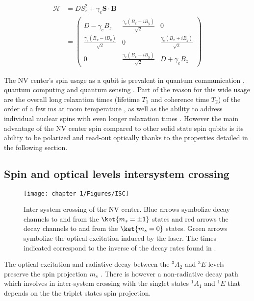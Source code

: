 \documentclass[a4paper,11pt]{report}
\begin{document}
\begin{refsection}
\begin{align}
\label{NV spin Hamiltonian basic}
\mathcal{H}&=D S_z^2 + \gamma_e \mathbf{S} \cdot \mathbf{B} \\
&=\begin{pmatrix}
D-\gamma_e B_z & \frac{\gamma_e (B_x+iB_y)}{\sqrt{2}} & 0 \\
\frac{\gamma_e (B_x-iB_y)}{\sqrt{2}} & 0 & \frac{\gamma_e (B_x+iB_y)}{\sqrt{2}} \\
0 & \frac{\gamma_e (B_x-iB_y)}{\sqrt{2}} & D+\gamma_e B_z
\end{pmatrix}
\end{align}

\bigskip
The NV center's spin usage as a qubit is prevalent in quantum communication \citep{wehner2018quantum}, quantum computing \citep{de2021materials} and quantum sensing \citep{degen2017quantum}. Part of the reason for this wide usage are the overall long relaxation times (lifetime $T_1$ and coherence time $T_2$) of the order of a few ms at room temperature \citep{balasubramanian2009ultralong}, as well as the ability to address individual nuclear spins with even longer relaxation times \citep{awschalom2018quantum}. However the main advantage of the NV center spin compared to other solid state spin qubits is its ability to be polarized and read-out optically thanks to the properties detailed in the following section.


\subsection{Spin and optical levels intersystem crossing}
\label{sec ISC}
\begin{figure}[h!]
\centering
\texttt{[image: chapter 1/Figures/ISC]}
\caption{Inter system crossing of the NV center. Blue arrows symbolize decay channels to and from the $\ket{m_s=\pm 1}$ states and red arrows the decay channels to and from the $\ket{m_s=0}$ states. Green arrows symbolize the optical excitation induced by the laser. The times indicated correspond to the inverse of the decay rates found in \citep{gupta2016efficient}.}
\label{ISC}
\end{figure}

The optical excitation and radiative decay between the $^3A_2$ and $^3E$ levels preserve the spin projection $m_s$ \citep{robledo2011spin}. There is however a non-radiative decay path which involves in inter-system crossing with the singlet states $^1A_1$ and $^1E$ that depends on the the triplet states spin projection.


\end{refsection}
\end{document}
